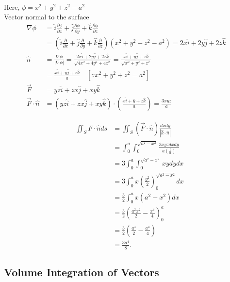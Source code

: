 \begin{answer}
	 Here, $\phi=x^{2}+y^{2}+z^{2}-a^{2}$
	\\Vector normal to the surface 
		\begin{align*}
		\nabla \phi&=\hat{i} \frac{\partial \phi}{\partial x}+\hat{j} \frac{\partial \phi}{\partial y}+\hat{k} \frac{\partial \phi}{\partial z}\\
		&=\left(\hat{i} \frac{\partial}{\partial x}+\hat{j} \frac{\partial}{\partial y}+\hat{k} \frac{\partial}{\partial z}\right)\left(x^{2}+y^{2}+z^{2}-a^{2}\right)=2 x \hat{i}+2 y \hat{j}+2 z \hat{k} \\ \hat{n} &=\frac{\nabla \phi}{|\nabla \phi|}=\frac{2 x \hat{i}+2 y \hat{j}+2 z \hat{k}}{\sqrt{4 x^{2}+4 y^{2}+4 z^{2}}}=\frac{x \hat{i}+y \hat{j}+z \hat{k}}{\sqrt{x^{2}+y^{2}+z^{2}}} \\ &=\frac{x \hat{i}+y \hat{j}+z \hat{k}}{a}\quad\left[\because x^{2}+y^{2}+z^{2}=a^{2}\right]\\	\vec{F}&=y z \hat{i}+z x \hat{j}+x y \hat{k}\\
		\vec{F} \cdot \hat{n}&=(y z \hat{i}+z x \hat{j}+x y \hat{k}) \cdot\left(\frac{x \hat{i}+\hat{y}+z \hat{k}}{a}\right)=\frac{3 x y z}{a}  \end{align*}
	
	\begin{align*}
		\quad \iint_{S} F \cdot \hat{n} d s&=\iint_{S}(\vec{F} \cdot \hat{n}) \frac{d x d y}{|\hat{k} \cdot \hat{n}|}\\&=\int_{0}^{a} \int_{0}^{\sqrt{a^{2}-x^{2}}} \frac{3 x y z d x d y}{a\left(\frac{z}{a}\right)}\\
		&=3 \int_{0}^{a} \int_{0}^{\sqrt{a^{2}-x^{2}}} x y d y d x\\
		&=3 \int_{0}^{a} x\left(\frac{y^{2}}{2}\right)_{0}^{\sqrt{a^{2}-x^{2}}} d x\\
		&=\frac{3}{2} \int_{0}^{a} x\left(a^{2}-x^{2}\right) d x\\
		&=\frac{3}{2}\left(\frac{a^{2} x^{2}}{2}-\frac{x^{4}}{4}\right)_{0}^{a}\\&=\frac{3}{2}\left(\frac{a^{4}}{2}-\frac{a^{4}}{4}\right)\\&=\frac{3 a^{4}}{8} .
	\end{align*}
	
\end{answer}
	
	

\subsection{Volume Integration of Vectors}

